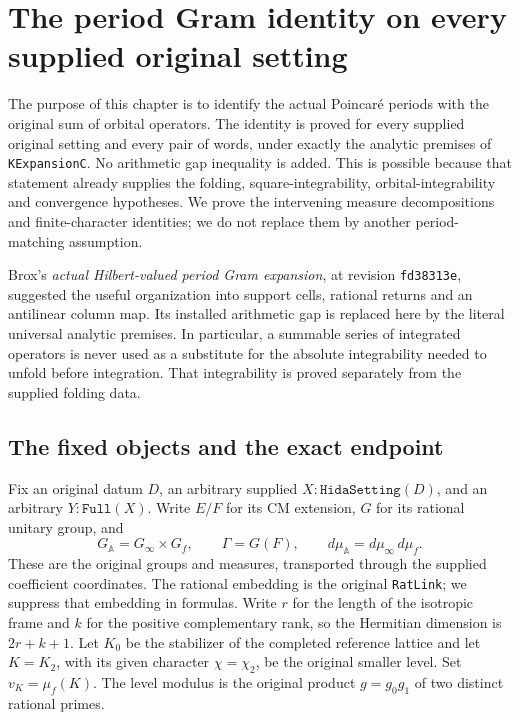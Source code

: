 \section{The period Gram identity on every supplied original setting}
\label{sec:period-gram-v57}

The purpose of this chapter is to identify the actual Poincar\'e periods
with the original sum of orbital operators.  The identity is proved for
every supplied original setting and every pair of words, under exactly
the analytic premises of \texttt{KExpansionC}.  No arithmetic gap
inequality is added.  This is possible because that statement already
supplies the folding, square-integrability, orbital-integrability and
convergence hypotheses.  We prove the intervening measure decompositions
and finite-character identities; we do not replace them by another
period-matching assumption.

Brox's \emph{actual Hilbert-valued period Gram expansion}, at revision
\texttt{fd38313e}, suggested the useful
organization into support cells, rational returns and an antilinear
column map.  Its installed arithmetic gap is replaced here by the
literal universal analytic premises.  In particular, a summable series
of integrated operators is never used as a substitute for the absolute
integrability needed to unfold before integration.  That integrability
is proved separately from the supplied folding data.

\subsection{The fixed objects and the exact endpoint}

Fix an original datum \(D\), an arbitrary supplied
\(X:\texttt{HidaSetting}(D)\), and an arbitrary
\(Y:\texttt{Full}(X)\).  Write \(E/F\) for its CM extension,
\(G\) for its rational unitary group, and
\[
 G_{\mathbb A}=G_\infty\times G_f,\qquad
 \Gamma=G(F),\qquad d\mu_{\mathbb A}=d\mu_\infty\,d\mu_f.
\]
These are the original groups and measures, transported through the
supplied coefficient coordinates.  The rational embedding is the
original \texttt{RatLink}; we suppress that embedding in formulas.
Write \(r\) for the length of the isotropic frame and \(k\) for the
positive complementary rank, so the Hermitian dimension is \(2r+k+1\).
Let \(K_0\) be the stabilizer of the completed reference lattice and
let \(K=K_2\), with its given character \(\chi=\chi_2\), be the
original smaller level.  Set \(v_K=\mu_f(K)\).  The level modulus is
the original product \(g=g_0g_1\) of two distinct rational primes.

